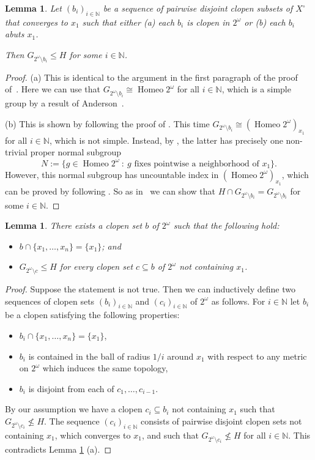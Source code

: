 \documentclass[12pt,a4paper,reqno]{amsart}
\numberwithin{equation}{section}
\theoremstyle{plain}
\newtheorem{lem}[thm]{Lemma}
\theoremstyle{definition}
\newcommand{\N}{\mathbb{N}}
\DeclareMathOperator{\Homeo}{Homeo}
\newcommand{\st}{\: :\:}
\begin{document}
\begin{lem} \label{la:Xo3Tk3}\label{la:Xo4Tk3}
 Let $(b_i)_{i\in\N}$ be a sequence of pairwise disjoint clopen subsets of $X^\circ$ that converges to $x_1$
 such that either (a) each $b_i$ is clopen in $2^\omega$ or (b) each $b_i$ abuts $x_1$.
 
 Then $G_{2^\omega\setminus b_i} \leq H$ for some $i\in\N$.  
\end{lem}

\begin{proof}
 (a) This is identical to the argument in the first paragraph of the proof of~\cite[Theorem 3.7]{Tr:IPG2}.
 Here we can use that $G_{2^\omega\setminus b_i}\cong\Homeo 2^\omega$ for all $i\in\N$, which is a simple group
 by a result of Anderson~\cite{An:ASC}.

 (b) This is shown by following the proof of \cite[Lemma 2.5]{Tr:IPG2}.
 This time $G_{2^\omega\setminus b_i} \cong (\Homeo 2^\omega)_{x_1}$ for all $i\in\N$, which is not simple.
 Instead, by \cite[Theorem 3.13]{Tr:IPG1}, the latter has precisely one non-trivial proper normal subgroup
\[
 N:=\{ g\in \Homeo 2^\omega \st g \text{ fixes pointwise a neighborhood of } x_1 \}.
\]
 However, this normal subgroup has uncountable index in $(\Homeo 2^\omega)_{x_1}$, which can be proved by following
 \cite[p.\ 499, par.\ 3]{Tr:IPG2}. So as in~\cite[Lemma 2.5]{Tr:IPG2} we can show that
 $H\cap G_{2^\omega\setminus b_i} = G_{2^\omega\setminus b_i}$ for some $i\in\N$. 
\end{proof}

\begin{lem}
\label{la:Xo5Tk3}
 There exists a clopen set $b$ of $2^\omega$ such that the following hold:
 \begin{itemize}
 \item $b\cap \{x_1,\dots,x_n\} = \{x_1\}$; and
 \item $G_{2^\omega\setminus c}\leq H$ for every clopen set $c\subseteq b$ of $ 2^\omega$ not containing $x_1$.
 \end{itemize}
\end{lem}


\begin{proof}
 Suppose the statement is not true. Then we can inductively define two sequences of clopen sets $(b_i)_{i\in\N}$ and
 $(c_i)_{i\in\N}$ of $2^\omega$ as follows.
 For $i\in\N$ let $b_i$ be a clopen satisfying the following properties:
\begin{itemize}
\item
$b_i \cap \{x_1,\dots,x_n\} = \{x_1\}$,
\item
$b_i$ is contained in the ball of radius $1/i$ around $x_1$ with respect to any metric on $2^\omega$ which induces the same topology,
\item
$b_i$ is disjoint from each of $c_1,\dots ,c_{i-1}$.
\end{itemize}
By our assumption we have a clopen $c_i\subseteq b_i$ not containing $x_1$ such that $G_{2^\omega\setminus c_i}\nleq H$.
The sequence $(c_i)_{i\in\N}$ consists of pairwise disjoint clopen sets not containing $x_1$, which converges to $x_1$,
and such that
$G_{2^\omega\setminus c_i}\nleq H$ for all $i\in\N$. This contradicts Lemma \ref{la:Xo3Tk3} (a).
\end{proof}
\end{document}
